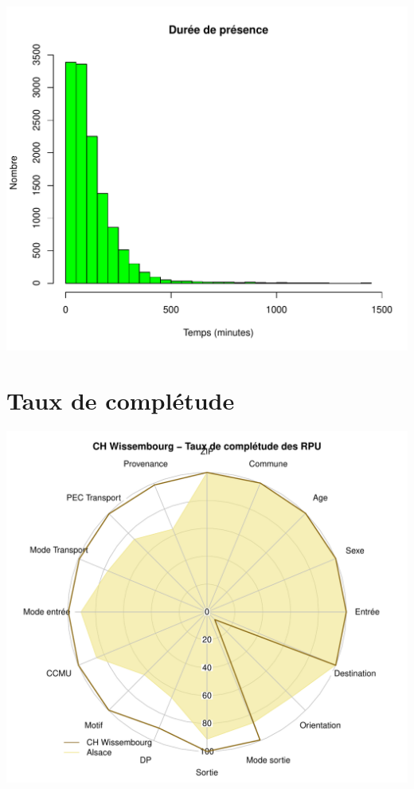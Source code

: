 \documentclass[12pt,english,french,twoside]{book}\usepackage[]{graphicx}\usepackage[]{color}
\makeatletter
\def\maxwidth{ %
  \ifdim\Gin@nat@width>\linewidth
    \linewidth
  \else
    \Gin@nat@width
  \fi
}
\newenvironment{knitrout}{}{} %
\makeatother
\begin{document}
\begin{knitrout}
\color{fgcolor}
\includegraphics[width=\maxwidth]{figure/graphe_wis} 

\end{knitrout}


\section*{Taux de complétude}

\begin{knitrout}
\color{fgcolor}
\includegraphics[width=\maxwidth]{figure/compl_wis} 

\end{knitrout}
\end{document}
